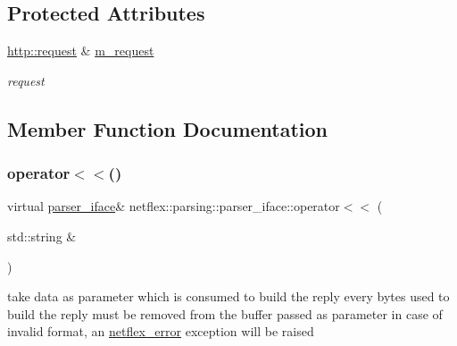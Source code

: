 \subsection*{Protected Attributes}
\begin{DoxyCompactItemize}
\item 
\mbox{\label{classnetflex_1_1parsing_1_1parser__iface_a893c1abb768c2884318d7f35d315621b}} 
\hyperlink{classnetflex_1_1http_1_1request}{http\+::request} \& \hyperlink{classnetflex_1_1parsing_1_1parser__iface_a893c1abb768c2884318d7f35d315621b}{m\+\_\+request}
\begin{DoxyCompactList}\small\item\em request \end{DoxyCompactList}\end{DoxyCompactItemize}


\subsection{Member Function Documentation}
\mbox{\label{classnetflex_1_1parsing_1_1parser__iface_ae41c581b5cb219fed4cf5fccf27011c3}} 
\subsubsection{\texorpdfstring{operator$<$$<$()}{operator<<()}}
{\footnotesize\ttfamily virtual \hyperlink{classnetflex_1_1parsing_1_1parser__iface}{parser\+\_\+iface}\& netflex\+::parsing\+::parser\+\_\+iface\+::operator$<$$<$ (\begin{DoxyParamCaption}\item[{std\+::string \&}]{ }\end{DoxyParamCaption})\hspace{0.3cm}{\ttfamily [pure virtual]}}

take data as parameter which is consumed to build the reply every bytes used to build the reply must be removed from the buffer passed as parameter in case of invalid format, an \hyperlink{classnetflex_1_1netflex__error}{netflex\+\_\+error} exception will be raised 

